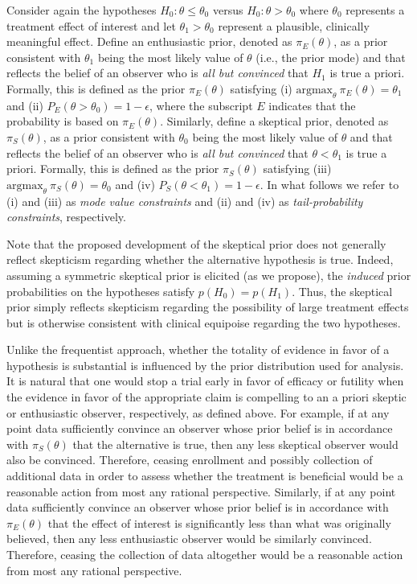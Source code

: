 \documentclass[useAMS,usenatbib,referee]{biom}
\begin{document}
Consider again the hypotheses $H_0: \theta \le \theta_0$ versus $H_0: \theta > \theta_0$ where $\theta_0$ represents a 
treatment effect of interest and let $\theta_1>\theta_0$ represent a plausible, clinically meaningful effect.
%
Define an enthusiastic prior, denoted as $\pi_{E}(\theta)$, as a prior consistent with $\theta_1$ being the most 
likely value of $\theta$ (i.e., the prior mode) and that reflects the belief of an observer who is 
\textit{all but convinced} that $H_1$ is true a priori. 
%
Formally, this is defined as the prior $\pi_E(\theta)$ satisfying (i) $\text{argmax}_\theta~\pi_E(\theta)=\theta_1$
and (ii) $P_E(\theta >\theta_0)=1-\epsilon$, where the subscript $E$ indicates that the probability is 
based on $\pi_{E}(\theta)$.
%
Similarly, define a skeptical prior, denoted as $\pi_{S}(\theta)$, as a prior consistent with $\theta_0$ being the most 
likely value of $\theta$ and that reflects the belief of an observer who is \textit{all but convinced} that 
$\theta <\theta_1$ is true a priori. 
%
Formally, this is defined as the prior $\pi_{S}(\theta)$ satisfying
(iii) $\text{argmax}_\theta~\pi_S(\theta)=\theta_0$  and (iv) $P_S(\theta <\theta_1)=1-\epsilon$.
%
In what follows we refer to (i) and (iii) as \textit{mode value constraints} and (ii) and (iv) as \textit{tail-probability constraints}, respectively.

Note that the proposed development of the skeptical prior does not generally reflect skepticism regarding whether the alternative hypothesis is true. 
%
Indeed, assuming a symmetric skeptical prior is elicited (as we propose), the \textit{induced} prior probabilities on the hypotheses
satisfy $p(H_0) =  p(H_1)$.
%
%
%
Thus, the skeptical prior simply reflects skepticism regarding the possibility of large treatment effects but is
otherwise consistent with clinical equipoise regarding the two hypotheses.
%

Unlike the frequentist approach, whether the totality of evidence in favor of a hypothesis is substantial is influenced by 
the prior distribution used for analysis.
%
It is natural that one would stop a trial early in favor of efficacy or futility when the evidence in favor of the appropriate claim is compelling
to an a priori skeptic or enthusiastic observer, respectively, as defined above.
%
For example, if at any point data sufficiently convince an observer whose prior belief is in accordance with $\pi_{S}(\theta)$ that 
the alternative is true, then any less skeptical observer would also be convinced. Therefore, ceasing enrollment and possibly collection 
of additional data in order to assess whether the treatment is beneficial would be a reasonable action from most any rational perspective.
%
Similarly, if at any point data sufficiently convince an observer whose prior belief is in accordance with $\pi_{E}(\theta)$ that 
the effect of interest is significantly less than what was originally believed, then any less enthusiastic observer would be similarly convinced.
Therefore, ceasing the collection of data altogether would be a reasonable action from most any rational perspective.
\end{document}
